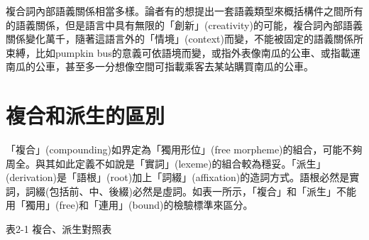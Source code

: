 \textrm{複合詞內部語義關係相當多樣。論者有的想提出一套語義類型來概括構件之間所有的語義關係，但是語言中具有無限的「創新」(creativity)的可能，複合詞內部語義關係變化萬千，隨著這語言外的「情境」(context)而變，不能被固定的語義關係所束縛，比如pumpkin bus的意義可依語境而變，或指外表像南瓜的公車、或指載運南瓜的公車，甚至多一分想像空間可指載乘客去某站購買南瓜的公車。}

\section{\rmfamily 複合和派生的區別}

\textrm{「複合」(compounding)如界定為「獨用形位」(free morpheme)的組合，可能不夠周全。與其如此定義不如說是「實詞」(lexeme)的組合較為穩妥。「派生」(derivation)是「語根」(root)加上「詞綴」(affixation)的造詞方式。語根必然是實詞，詞綴(包括前、中、後綴)必然是虛詞。如表一所示，「複合」和「派生」不能用「獨用」(free)和「連用」(bound)的檢驗標準來區分。}

\textrm{表2-1 複合、}派生對照表

\tablefirsthead{}

